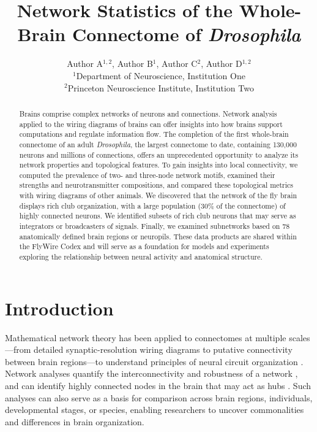\documentclass{article}
\title{Network Statistics of the Whole-Brain Connectome of \textit{Drosophila}}
\author{
Author A$^{1,2}$, Author B$^{1}$, Author C$^{2}$, Author D$^{1,2}$ \\
$^{1}$Department of Neuroscience, Institution One \\
$^{2}$Princeton Neuroscience Institute, Institution Two
}
\date{}
\begin{document}
\maketitle

\begin{abstract}
Brains comprise complex networks of neurons and connections. Network analysis applied to the wiring diagrams of brains can offer insights into how brains support computations and regulate information flow. The completion of the first whole-brain connectome of an adult \textit{Drosophila}, the largest connectome to date, containing 130,000 neurons and millions of connections, offers an unprecedented opportunity to analyze its network properties and topological features. To gain insights into local connectivity, we computed the prevalence of two- and three-node network motifs, examined their strengths and neurotransmitter compositions, and compared these topological metrics with wiring diagrams of other animals. We discovered that the network of the fly brain displays rich club organization, with a large population (30\% of the connectome) of highly connected neurons. We identified subsets of rich club neurons that may serve as integrators or broadcasters of signals. Finally, we examined subnetworks based on 78 anatomically defined brain regions or neuropils. These data products are shared within the FlyWire Codex and will serve as a foundation for models and experiments exploring the relationship between neural activity and anatomical structure.
\end{abstract}

\section{Introduction}

Mathematical network theory has been applied to connectomes at multiple scales---from detailed synaptic-resolution wiring diagrams to putative connectivity between brain regions---to understand principles of neural circuit organization \citep{sporns2005human, varshney2011structural}. Network analyses quantify the interconnectivity and robustness of a network \citep{latora2001efficient, humphries2008network, explorability2017}, and can identify highly connected nodes in the brain that may act as hubs \citep{colizza2006detecting, sallet2013mapping}. Such analyses can also serve as a basis for comparison across brain regions, individuals, developmental stages, or species, enabling researchers to uncover commonalities and differences in brain organization.
\end{document}
